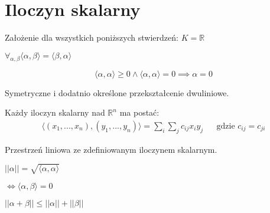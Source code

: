 \section{Iloczyn skalarny}
Założenie dla wszystkich poniższych stwierdzeń: $K = \mathbb{R}$


\begin{definition}
    $ \forall_{\alpha, \beta} \langle \alpha, \beta \rangle = \langle \beta, \alpha \rangle $
\end{definition}

\begin{definition} 
    \[ \langle \alpha, \alpha \rangle \geq 0 \land \langle \alpha, \alpha \rangle = 0 \implies \alpha = 0 \]
\end{definition}

\begin{definition}
    Symetryczne i dodatnio określone przekształcenie dwuliniowe. 
\end{definition}

\begin{theorem}
    Każdy iloczyn skalarny nad $\mathbb{R}^n$ ma postać:
    \begin{align*}
        \langle (x_1, ..., x_n), (y_1, ..., y_n) \rangle = \sum_i \sum_j c_{ij} x_i y_j & & \text{gdzie }c_{ij} = c_{ji}
    \end{align*}
\end{theorem}

\begin{definition}
    Przestrzeń liniowa ze zdefiniowanym iloczynem skalarnym.
\end{definition}

\begin{definition}[miara]
    $ || \alpha || = \sqrt{\langle \alpha, \alpha \rangle} $
\end{definition}

\begin{definition}
    $ \iff \langle  \alpha, \beta \rangle = 0 $ 
\end{definition}

\begin{corollary}[trójkąt]
    $ || \alpha + \beta || \leq || \alpha || + || \beta || $
\end{corollary}

